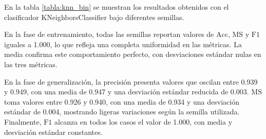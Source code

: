 En la tabla \ref{tabla:knn_bin} se muestran los resultados obtenidos con el clasificador KNeighborsClassifier bajo diferentes semillas.

\vspace{1em}

En la fase de entrenamiento, todas las semillas reportan valores de $\text{Acc}$, $\text{MS}$ y $\text{F1}$ iguales a 1.000, lo que refleja una completa uniformidad en las métricas. La media confirma este comportamiento perfecto, con desviaciones estándar nulas en las tres métricas.

\vspace{1em}

En la fase de generalización, la precisión presenta valores que oscilan entre 0.939 y 0.949, con una media de 0.947 y una desviación estándar reducida de 0.003. $\text{MS}$ toma valores entre 0.926 y 0.940, con una media de 0.934 y una desviación estándar de 0.004, mostrando ligeras variaciones según la semilla utilizada. Finalmente, $\text{F1}$ alcanza en todos los casos el valor de 1.000, con media y desviación estándar constantes.

